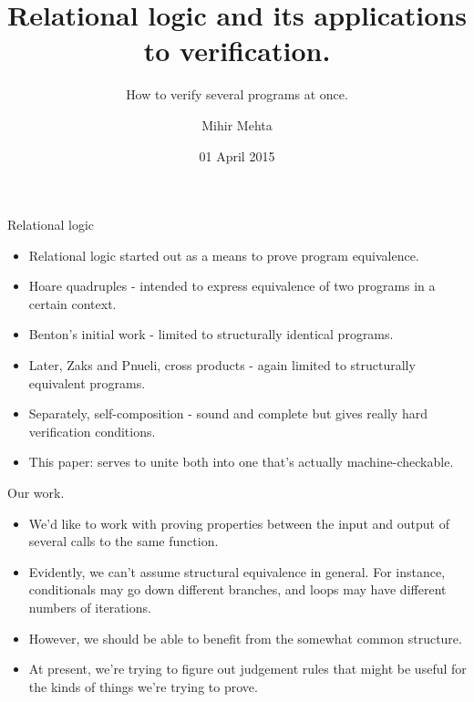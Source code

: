\documentclass{beamer}
\title{Relational logic and its applications to verification.}
\subtitle{How to verify several programs at once.}
\author{Mihir Mehta}
\institute{
  Department of Computer Science\\
  University of Texas at Austin\\
  \texttt{mihir@cs.utexas.edu}
}
\date{01 April 2015}
\begin{document}
\begin{frame}
  \titlepage
\end{frame}

\begin{frame}{Relational logic}
\begin{itemize}
\item Relational logic started out as a means to prove program
  equivalence.
\item Hoare quadruples - intended to express equivalence of two
  programs in a certain context.
\item Benton's initial work - limited to structurally identical
  programs.
\item Later, Zaks and Pnueli, cross products - again limited to
  structurally equivalent programs.
\item Separately, self-composition - sound and complete but gives
  really hard verification conditions.
\item This paper: serves to unite both into one that's actually machine-checkable.
\end{itemize}
\end{frame}

\begin{frame}{Our work.}
\begin{itemize}
\item We'd like to work with proving properties between the input and
  output of several calls to the same function.
\item Evidently, we can't assume structural equivalence in
  general. For instance, conditionals may go down different branches,
  and loops may have different numbers of iterations.
\item However, we should be able to benefit from the somewhat common
  structure.
\item At present, we're trying to figure out judgement rules that
  might be useful for the kinds of things we're trying to prove.
\end{itemize}
\end{frame}
\end{document}
